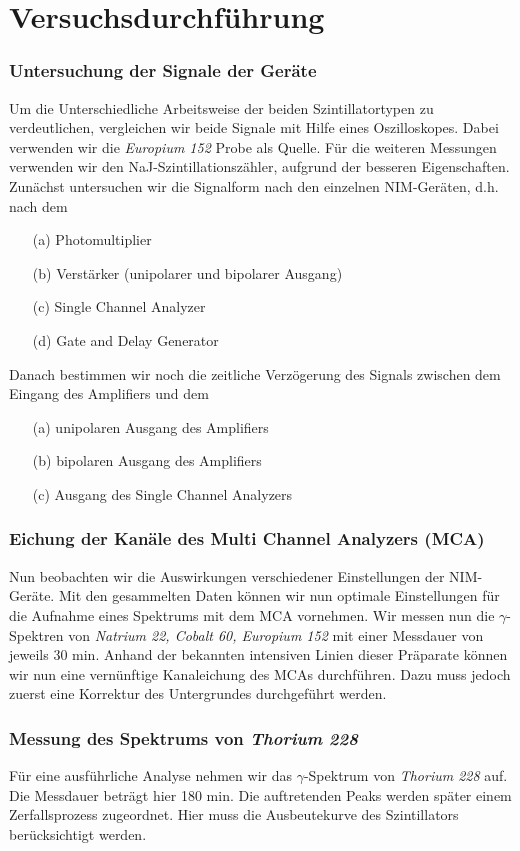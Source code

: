 \documentclass[10pt,a4paper]{article}
\author{Wolfgang Breu, Timur Numi\'{c}}
\begin{document}
\part*{Versuchsdurchführung}
\section{Untersuchung der Signale der Geräte}
Um die Unterschiedliche Arbeitsweise der beiden Szintillatortypen zu verdeutlichen, vergleichen wir beide Signale mit Hilfe eines Oszilloskopes. Dabei verwenden wir die \textit{Europium 152} Probe als Quelle.
Für die weiteren Messungen verwenden wir den NaJ-Szintillationszähler, aufgrund der besseren Eigenschaften. Zunächst untersuchen wir die Signalform nach den einzelnen NIM-Geräten, d.h. nach dem
\begin{itemize}
\item[(a)] Photomultiplier
\item[(b)] Verstärker (unipolarer und bipolarer Ausgang)
\item[(c)] Single Channel Analyzer
\item[(d)] Gate and Delay Generator
\end{itemize}
Danach bestimmen wir noch die zeitliche Verzögerung des Signals zwischen dem Eingang des Amplifiers und dem 
\begin{itemize}
\item[(a)] unipolaren Ausgang des Amplifiers
\item[(b)] bipolaren Ausgang des Amplifiers
\item[(c)] Ausgang des Single Channel Analyzers
\end{itemize}
\section{Eichung der Kanäle des Multi Channel Analyzers (MCA)}
Nun beobachten wir die Auswirkungen verschiedener Einstellungen der NIM-Geräte. Mit den gesammelten Daten können wir nun optimale Einstellungen für die Aufnahme eines Spektrums mit dem MCA vornehmen. Wir messen nun die $\gamma$-Spektren von \textit{Natrium 22, Cobalt 60, Europium 152} mit einer Messdauer von jeweils 30 min. Anhand der bekannten intensiven Linien dieser Präparate können wir nun eine vernünftige Kanaleichung des MCAs durchführen. Dazu muss jedoch zuerst eine Korrektur des Untergrundes durchgeführt werden. 
\section{Messung des Spektrums von \textit{Thorium 228}}
Für eine ausführliche Analyse nehmen wir das $\gamma$-Spektrum von \textit{Thorium 228} auf. Die Messdauer beträgt hier 180 min. Die auftretenden Peaks werden später einem Zerfallsprozess zugeordnet. Hier muss die Ausbeutekurve des Szintillators berücksichtigt werden.
\end{document}
